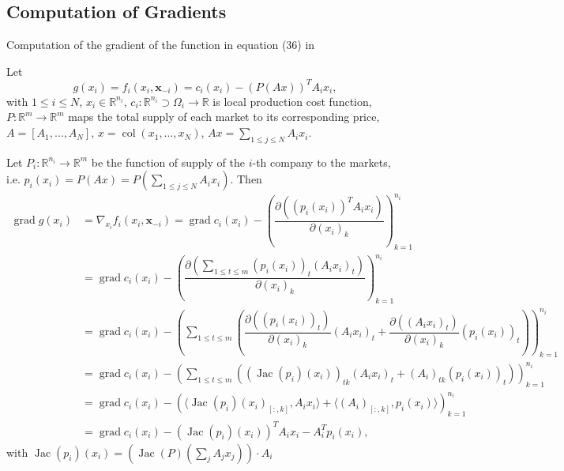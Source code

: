 
\subsection*{Computation of Gradients}

Computation of the gradient of the function in equation (36) in \citep{Yi_2019}

Let
$$g(x_i) = f_i(x_i, \mathbf{x}_{-i}) = c_i(x_i) - (P(Ax))^T A_ix_i,$$
with $1 \leqslant i \leqslant N$, $x_i \in \mathbb{R}^{n_i}$, $c_i: \mathbb{R}^{n_i} \supset \Omega_i \to \mathbb{R}$ is local production cost function, $P: \mathbb{R}^m \to \mathbb{R}^m$ maps the total supply of each market to its corresponding price, $A = [A_1, \ldots, A_N]$, $x = \operatorname{col}(x_1, \ldots, x_N)$, $Ax = \sum\limits_{1 \leqslant j \leqslant N} A_ix_i$. 

Let $P_i: \mathbb{R}^{n_i} \to \mathbb{R}^m$ be the function of supply of the $i$-th company to the markets, i.e. $p_i(x_i) = P(Ax) = P\left(\sum\limits_{1 \leqslant j \leqslant N} A_ix_i\right)$. Then
\begin{align*}
\operatorname{grad} g(x_i) & = \nabla_{x_i} f_i(x_i, \mathbf{x}_{-i}) = \operatorname{grad} c_i(x_i) - \left( \dfrac{\partial \left( (p_i(x_i))^T A_ix_i \right)}{\partial (x_i)_k} \right)_{k=1}^{n_i} \\
& = \operatorname{grad} c_i(x_i) - \left( \dfrac{\partial \left( \sum\limits_{1\leqslant t \leqslant m} (p_i(x_i))_t (A_ix_i)_t \right)}{\partial (x_i)_k} \right)_{k=1}^{n_i} \\
& = \operatorname{grad} c_i(x_i) - \left( \sum\limits_{1\leqslant t \leqslant m}\left( \dfrac{\partial \left( (p_i(x_i))_t \right)}{\partial (x_i)_k} (A_ix_i)_t + \dfrac{\partial \left( (A_ix_i)_t \right)}{\partial (x_i)_k} (p_i(x_i))_t \right) \right)_{k=1}^{n_i} \\
& = \operatorname{grad} c_i(x_i) - \left( \sum\limits_{1\leqslant t \leqslant m}\left( \left(\operatorname{Jac} (p_i)(x_i) \right)_{tk} (A_ix_i)_t + (A_i)_{tk} (p_i(x_i))_t \right) \right)_{k=1}^{n_i} \\
& = \operatorname{grad} c_i(x_i) - \left( \langle \operatorname{Jac}(p_i)(x_i)_{[:,k]}, A_ix_i \rangle + \langle (A_i)_{[:,k]}, p_i(x_i) \rangle \right)_{k=1}^{n_i} \\
& =\operatorname{grad} c_i(x_i) - \left( \operatorname{Jac}(p_i)(x_i) \right)^T A_ix_i - A_i^T p_i(x_i),
\end{align*}
with $\operatorname{Jac}(p_i)(x_i) = \left( \operatorname{Jac}(P)(\sum\limits_j A_jx_j) \right) \cdot A_i$



